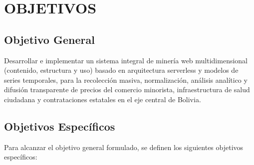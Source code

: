 \section{OBJETIVOS}

\subsection{Objetivo General}
Desarrollar e implementar un sistema integral de minería web multidimensional (contenido, estructura y uso) basado en arquitectura serverless y modelos de series temporales, para la recolección masiva, normalización, análisis analítico y difusión transparente de precios del comercio minorista, infraestructura de salud ciudadana y contrataciones estatales en el eje central de Bolivia.

\subsection{Objetivos Específicos}
Para alcanzar el objetivo general formulado, se definen los siguientes objetivos específicos:

